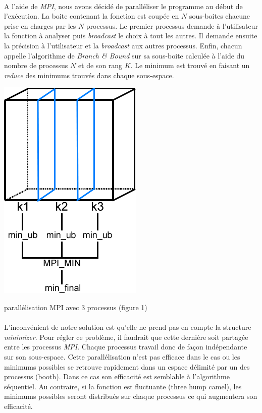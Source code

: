 \documentclass[a4paper]{article}
\begin{document}
    \paragraph{}
    A l'aide de \emph{MPI}, nous avons décidé de paralléliser le programme au début de l’exécution. La boite contenant la fonction est coupée en $N$ sous-boites chacune prise en charges par les $N$ processus.
    Le premier processus demande à l'utilisateur la fonction à analyser puis \emph{broadcast} le choix à tout les autres. Il demande ensuite la précision à l'utilisateur et la \emph{broadcast} aux autres processus.
    Enfin, chacun appelle l'algorithme de \emph{Branch \& Bound} sur sa sous-boite calculée à l'aide du nombre de processus $N$ et de son rang $K$. Le minimum est trouvé en faisant un \emph{reduce} des minimums trouvés dans chaque sous-espace.
    \begin{center}
    \includegraphics[scale=0.7]{min_mpi.png}
    {\footnotesize

    parallélisation MPI avec 3 processus (figure 1)\par}
    \end{center}
    \paragraph{}
    L’inconvénient de notre solution est qu'elle ne prend pas en compte la structure \emph{minimizer}. Pour régler ce problème, il faudrait que cette dernière soit partagée entre les processus \emph{MPI}. Chaque processus travail donc de façon indépendante sur son sous-espace. Cette parallélisation n'est pas efficace dans le cas ou les minimums possibles se retrouve rapidement dans un espace délimité par un des processus (booth). Dans ce cas son efficacité est semblable à l'algorithme séquentiel. Au contraire, si la fonction est fluctuante (three hump camel), les minimums possibles seront distribués sur chaque processus ce qui augmentera son efficacité.
\end{document}
